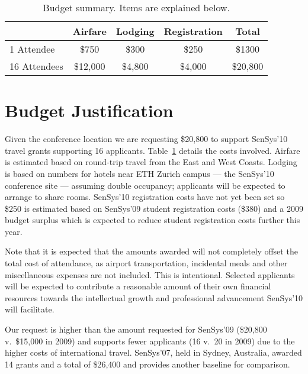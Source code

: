 \documentclass[11pt,letterpaper]{article}
\begin{document}
\begin{table}[t]
\begin{center}
\begin{tabular}{|l|ccc|c|}
\hline
& \textbf{Airfare} & \textbf{Lodging} & \textbf{Registration} & \textbf{Total} \\
\hline \hline
1 Attendee & \$750 & \$300 & \$250 & \$1300 \\
16 Attendees & \$12,000 & \$4,800 & \$4,000 & \$20,800 \\
\hline
\end{tabular}
\end{center}
\caption{Budget summary. Items are explained below.}
\label{table-budget}
\end{table}

\section*{Budget Justification}
\label{sec-budget}

Given the conference location we are requesting \$20,800 to support SenSys'10
travel grants supporting 16 applicants. Table~\ref{table-budget} details the
costs involved. Airfare is estimated based on round-trip travel from the East
and West Coasts. Lodging is based on numbers for hotels near ETH Zurich
campus --- the SenSys'10 conference site --- assuming double occupancy;
applicants will be expected to arrange to share rooms. SenSys'10 registration
costs have not yet been set so \$250 is estimated based on SenSys'09 student
registration costs (\$380) and a 2009 budget surplus which is expected to
reduce student registration costs further this year.

Note that it is expected that the amounts awarded will not completely offset
the total cost of attendance, as airport transportation, incidental meals and
other miscellaneous expenses are not included. This is intentional. Selected
applicants will be expected to contribute a reasonable amount of their own
financial resources towards the intellectual growth and professional
advancement SenSys'10 will facilitate.

Our request is higher than the amount requested for SenSys'09 (\$20,800
v.~\$15,000 in 2009) and supports fewer applicants (16 v.~20 in 2009) due to
the higher costs of international travel. SenSys'07, held in Sydney,
Australia, awarded 14 grants and a total of \$26,400 and provides another
baseline for comparison.
\end{document}
